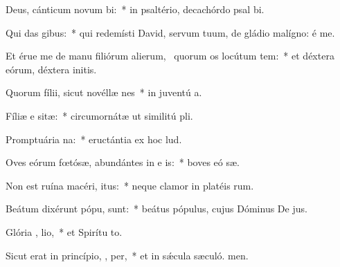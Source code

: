 \item Deus, cánticum novum  bi:~* in psaltério, decachórdo psal bi.
\item Qui das  gibus:~* qui redemísti David, servum tuum, de gládio malígno: é me.
\item Et érue me de manu filiórum alierum,~\pscross{} quorum os locútum  tem:~* et déxtera eórum, déxtera initis.
\item Quorum fílii, sicut novéllæ nes~* in juventú a.
\item Fíliæ e sitæ:~* circumornátæ ut similitú pli.
\item Promptuária  na:~* eructántia ex hoc  lud.
\item Oves eórum fœtósæ, abundántes in e is:~* boves eó sæ.
\item Non est ruína macéri,  itus:~* neque clamor in platéis rum.
\item Beátum dixérunt pópu,   sunt:~* beátus pópulus, cujus Dóminus De jus.
\item Glória ,  lio,~* et Spirítu to.
\item Sicut erat in princípio,  ,  per,~* et in sǽcula sæculó. men.

